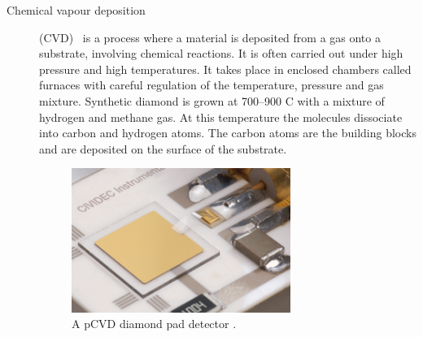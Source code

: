 \begin{description}
\item[Chemical vapour deposition] (CVD)~\cite{CVD:00000} is a process where a material is deposited from a gas onto a substrate, involving chemical reactions. It is often carried out under high pressure and high temperatures. It takes place in enclosed chambers called furnaces with careful regulation of the temperature, pressure and gas mixture. Synthetic diamond is grown at 700--900 \textdegree C with a mixture of hydrogen and methane gas. At this temperature the molecules dissociate into carbon and hydrogen atoms. The carbon atoms are the building blocks and are deposited on the surface of the substrate.

\begin{figure}[!t]
\centering
\includegraphics[width=0.7\textwidth]{01_introduction/pics/cividecpcvd}
\caption{A pCVD diamond pad detector \cite{Cividec:00000}.}
\label{fig:cividecpcvd}
\end{figure}


\end{description}
